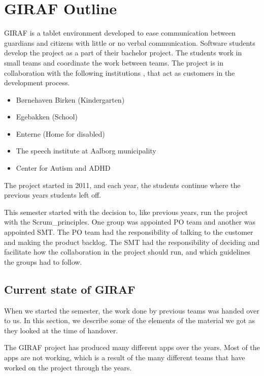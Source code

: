 \chapter{GIRAF Outline}

GIRAF is a tablet environment developed to ease communication between \glspl{guardian} and \glspl{citizen} with little or no verbal communication. Software students develop the project as a part of their bachelor project. The students work in small teams and coordinate the work between teams. The project is in collaboration with the following institutions \cite{GirafWebsite}, that act as customers in the development process.

\begin{itemize}
    \item Børnehaven Birken (Kindergarten) \cite{bhBirken}
    \item Egebakken (School) \cite{egebakken}
    \item Enterne (Home for disabled) \cite{enterne}
    \item The speech institute at Aalborg municipality
    \item Center for Autism and ADHD \cite{center_for_autism}
\end{itemize}

The project started in 2011, and each year, the students continue where the previous years students left off.

This semester started with the decision to, like previous years, run the project with the \gls{Scrum_principles}. One group was appointed \gls{PO} team and another was appointed \gls{SMT}. The \gls{PO} team had the responsibility of talking to the customer and making the product backlog. The \gls{SMT} had the responsibility of deciding and facilitate how the collaboration in the project should run, and which guidelines the groups had to follow.

\section{Current state of GIRAF}

When we started the semester, the work done by previous teams was handed over to us. In this section, we describe some of the elements of the material we got as they looked at the time of handover.

The GIRAF project has produced many different apps over the years. Most of the apps are not working, which is a result of the many different teams that have worked on the project through the years.

